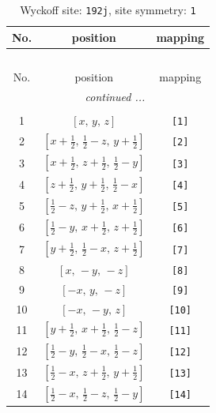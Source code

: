 \documentclass[fleqn,8pt]{jsarticle}
\begin{document}
\begin{longtable}{ccc}
\caption{Wyckoff site: {\tt 192j}, site symmetry: {\tt 1}}
 \\
 \hline \hline
No. & position & mapping \\ \hline \endfirsthead

\multicolumn{2}{l}{\tablename\ \thetable{}} \\
 \hline \hline
No. & position & mapping \\ \hline \endhead

 \hline \hline
\multicolumn{2}{r}{\footnotesize\it continued ...} \\ \endfoot

 \hline \hline
\multicolumn{2}{r}{} \\ \endlastfoot

1 & $\left[ x,\, y,\, z \right]$ & {\tt [1]} \\ \hline
2 & $\left[ x + \frac{1}{2},\, \frac{1}{2} - z,\, y + \frac{1}{2} \right]$ & {\tt [2]} \\ \hline
3 & $\left[ x + \frac{1}{2},\, z + \frac{1}{2},\, \frac{1}{2} - y \right]$ & {\tt [3]} \\ \hline
4 & $\left[ z + \frac{1}{2},\, y + \frac{1}{2},\, \frac{1}{2} - x \right]$ & {\tt [4]} \\ \hline
5 & $\left[ \frac{1}{2} - z,\, y + \frac{1}{2},\, x + \frac{1}{2} \right]$ & {\tt [5]} \\ \hline
6 & $\left[ \frac{1}{2} - y,\, x + \frac{1}{2},\, z + \frac{1}{2} \right]$ & {\tt [6]} \\ \hline
7 & $\left[ y + \frac{1}{2},\, \frac{1}{2} - x,\, z + \frac{1}{2} \right]$ & {\tt [7]} \\ \hline
8 & $\left[ x,\, - y,\, - z \right]$ & {\tt [8]} \\ \hline
9 & $\left[ - x,\, y,\, - z \right]$ & {\tt [9]} \\ \hline
10 & $\left[ - x,\, - y,\, z \right]$ & {\tt [10]} \\ \hline
11 & $\left[ y + \frac{1}{2},\, x + \frac{1}{2},\, \frac{1}{2} - z \right]$ & {\tt [11]} \\ \hline
12 & $\left[ \frac{1}{2} - y,\, \frac{1}{2} - x,\, \frac{1}{2} - z \right]$ & {\tt [12]} \\ \hline
13 & $\left[ \frac{1}{2} - x,\, z + \frac{1}{2},\, y + \frac{1}{2} \right]$ & {\tt [13]} \\ \hline
14 & $\left[ \frac{1}{2} - x,\, \frac{1}{2} - z,\, \frac{1}{2} - y \right]$ & {\tt [14]} \\ \hline

\end{longtable}
\end{document}
